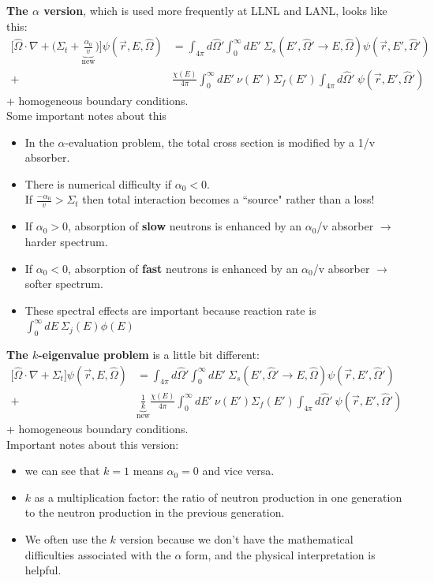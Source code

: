 \documentclass[12pt]{article}
\newcommand{\vOmega}{\ensuremath{\hat{\Omega}}}
\begin{document}
\textbf{The $\alpha$ version}, which is used more frequently at LLNL and LANL, looks like this:
%
\begin{align*}
\bigl[\vOmega \cdot \nabla + \bigl(\Sigma_t + \underbrace{\frac{\alpha_0}{v}}_{\text{new}}\bigr)\bigr]\psi(\vec{r}, E, \vOmega) &= \int_{4 \pi} d\vOmega' \int_0^{\infty} dE' \: \Sigma_s(E', \vOmega' \rightarrow E, \vOmega) \psi(\vec{r}, E', \vOmega')\\
 +& \frac{\chi(E)}{4 \pi}\int_0^{\infty} dE' \: \nu(E') \Sigma_f(E') \int_{4 \pi} d\vOmega' \:\psi(\vec{r}, E', \vOmega')
\end{align*}
+ homogeneous boundary conditions.\\
%
Some important notes about this
\begin{itemize}
\item In the $\alpha$-evaluation problem, the total cross section is modified by a 1/v absorber.
\item There is numerical difficulty if $\alpha_0 < 0$.\\
If $\frac{-\alpha_0}{v} > \Sigma_t$ then total interaction becomes a ``source" rather than a loss!
\item If $\alpha_0 > 0$, absorption of \textbf{slow} neutrons is enhanced by an $\alpha_0$/v absorber $\rightarrow$ harder spectrum.
\item If $\alpha_0 < 0$, absorption of \textbf{fast} neutrons is enhanced by an $\alpha_0$/v absorber $\rightarrow$ softer spectrum.
\item These spectral effects are important because reaction rate is $\int_0^{\infty} dE \:\Sigma_j(E) \phi(E)$
\end{itemize}

\textbf{The $k$-eigenvalue problem} is a little bit different:
%
\begin{align*}
\bigl[\vOmega \cdot \nabla + \Sigma_t \bigr]\psi(\vec{r}, E, \vOmega) &= \int_{4 \pi} d\vOmega' \int_0^{\infty} dE' \: \Sigma_s(E', \vOmega' \rightarrow E, \vOmega) \psi(\vec{r}, E', \vOmega')\\
 +& \underbrace{\frac{1}{k}}_{\text{new}}\frac{\chi(E)}{4 \pi}\int_0^{\infty} dE' \: \nu(E') \Sigma_f(E') \int_{4 \pi} d\vOmega' \:\psi(\vec{r}, E', \vOmega')
\end{align*}
%
+ homogeneous boundary conditions.\\
Important notes about this version:
\begin{itemize}
\item we can see that $k=1$ means $\alpha_0 = 0$ and vice versa.
\item $k$ as a multiplication factor: the ratio of neutron production in one generation to the neutron production in the previous generation.
\item We often use the $k$ version because we don't have the mathematical difficulties associated with the $\alpha$ form, and the physical interpretation is helpful.
\end{itemize}
\end{document}
